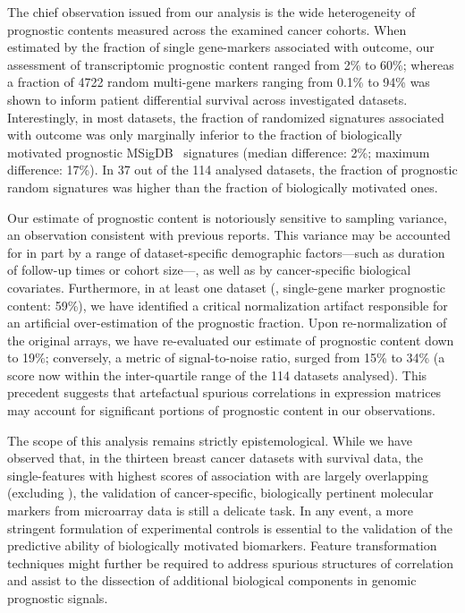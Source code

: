The chief observation issued from our analysis is the wide heterogeneity of
prognostic contents measured across the examined cancer cohorts.  When estimated
by the fraction of single gene-markers associated with outcome, our assessment
of transcriptomic prognostic content ranged from 2\% to 60\%; whereas a fraction
of 4722 random multi-gene markers ranging from 0.1\% to 94\% was shown to
inform patient differential survival across investigated datasets.
Interestingly, in most datasets, the fraction of randomized signatures
associated with outcome was only marginally inferior to the fraction of
biologically motivated prognostic MSigDB~ signatures (median
difference: 2\%; maximum difference: 17\%).  In 37 out of the 114 analysed
datasets, the fraction of prognostic random signatures was higher than the
fraction of biologically motivated ones.

Our estimate of prognostic content is notoriously sensitive to sampling
variance, an observation consistent with previous
reports.\cite{ein-dor_outcome_2005} This variance may be accounted for in part
by a range of dataset-specific demographic factors---such as duration of
follow-up times or cohort size---, as well as by cancer-specific biological
covariates.  Furthermore, in at least one dataset (,
single-gene marker prognostic content: 59\%), we have identified a critical
normalization artifact responsible for an artificial over-estimation of the
prognostic fraction.  Upon re-normalization of the original arrays, we have
re-evaluated our estimate of prognostic content down to 19\%; conversely, a
metric of signal-to-noise ratio,\cite{venet_measure_2012} surged from 15\% to
34\% (a score now within the inter-quartile range of the 114 datasets analysed).
This precedent suggests that artefactual spurious correlations in expression
matrices may account for significant portions of prognostic content in our
observations.

The scope of this analysis remains strictly epistemological.  While we have
observed that, in the thirteen breast cancer datasets with 
survival data, the single-features with highest scores of association with
 are largely overlapping (excluding ), the
validation of cancer-specific, biologically pertinent molecular markers from
microarray data is still a delicate task.  In any event, a more stringent
formulation of experimental controls is essential to the validation of the
predictive ability of biologically motivated
biomarkers.\cite{beck_significance_2013} Feature transformation techniques might
further be required to address spurious structures of correlation and assist to
the dissection of additional biological components in genomic prognostic
signals.

